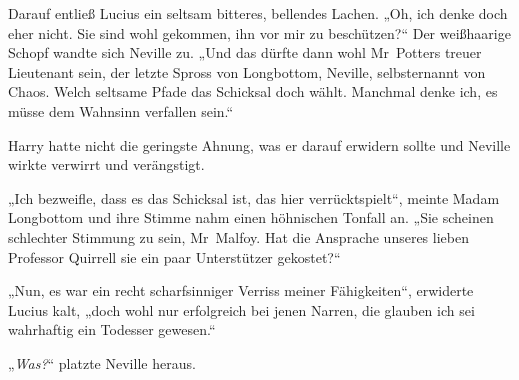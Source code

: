 Darauf entließ Lucius ein seltsam bitteres, bellendes Lachen.
„Oh, ich denke doch eher nicht. Sie sind wohl gekommen, ihn vor mir zu beschützen?“ Der weißhaarige Schopf wandte sich Neville zu.
„Und das dürfte dann wohl Mr~Potters treuer Lieutenant sein, der letzte Spross von Longbottom, Neville, selbsternannt von Chaos. Welch seltsame Pfade das Schicksal doch wählt. Manchmal denke ich, es müsse dem Wahnsinn verfallen sein.“

Harry hatte nicht die geringste Ahnung, was er darauf erwidern sollte und Neville wirkte verwirrt und verängstigt.

„Ich bezweifle, dass es das Schicksal ist, das hier verrücktspielt“, meinte Madam Longbottom und ihre Stimme nahm einen höhnischen Tonfall an.
„Sie scheinen schlechter Stimmung zu sein, Mr~Malfoy. Hat die Ansprache unseres lieben Professor Quirrell sie ein paar Unterstützer gekostet?“

„Nun, es war ein recht scharfsinniger Verriss meiner Fähigkeiten“, erwiderte Lucius kalt, „doch wohl nur erfolgreich bei jenen Narren, die glauben ich sei wahrhaftig ein Todesser gewesen.“

„\emph{Was?}“ platzte Neville heraus.

